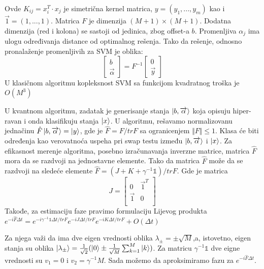 \documentclass[12pt, letterpaper, oneside]{article}
\begin{document}
Ovde $K_{ij} = x_i^T \cdot x_j$ je simetrična kernel matrica, $y = (y_1,...,y_m)$ kao i
$\overrightarrow{1} = (1,...,1)$. Matrica $F$ je dimenzija $(M+1)\times(M+1)$. Dodatna dimenzija (red i kolona) se sastoji od jedinica,
zbog offset-a $b$. Promenljiva $\alpha_j$ ima ulogu određivanja distance od optimalnog rešenja. Tako da rešenje, odnosno pronalaženje promenljivih za SVM je oblika:
\[
    \begin{bmatrix}
        b \\
        \overrightarrow{\alpha}
    \end{bmatrix} =
    F^{-1} \begin{bmatrix}
        0 \\
        \overrightarrow{y}
    \end{bmatrix}
\]
U klasičnom algoritmu kopleksnost SVM sa funkcijom kvadratnog troška je $O(M^3)$ 

U kvantnom algoritmu, zadatak je generisanje stanja $\Ket{b,\overrightarrow{\alpha}}$ koja opisuju hiper-ravan i onda klasifikuju stanja
$\Ket{x}$. U algoritmu, rešavamo normalizovanu jednačinu $\hat{F}\Ket{b,\overrightarrow{\alpha}} = \Ket{y}$, gde je $\hat{F} = F/trF$ sa 
ogranicenjem $\Vert F \Vert \leq 1$. Klasa će biti određenja kao verovatnoća uspeha pri swap testu između $\Ket{b,\overrightarrow{\alpha}}$ i
$\Ket{x}$. Za efikasnost merenje algoritma, posebno izračunavanja inverzne matrice, matrica $\hat{F}$ mora da se razdvoji na jednostavne elemente.
Tako da matrica $\hat{F}$ može da se razdvoji na sledeće elemente $\hat{F} = (J+K+\gamma^{-1}\mathbb{1})/trF$. 
Gde je matrica
\[
    J = \begin{bmatrix}
        0 & \overrightarrow{1}^T \\
        \overrightarrow{1} & 0 \\
    \end{bmatrix}
\]
Takođe, za estimaciju faze pravimo formulaciju Lijevog produkta \\
$e^{-i\hat{F}\varDelta{t}} = e^{-i\gamma^{-1}\mathbb{1}\varDelta{t}/trF}e^{-iJ\varDelta{t}/trF}e^{-iK\varDelta{t}/trF} + O(\varDelta{t})$

Za njega važi da ima dve eigen vrednosti oblika $\lambda_{\pm} = \pm \sqrt{M}$,a, istovetno, 
eigen stanja su oblika $\Ket{\lambda_{\pm}} = \frac{1}{\sqrt{2}}(\Ket{0} \pm \frac{1}{\sqrt{M}}\sum_{k=1}^M\Ket{k})$.
Za matricu $\gamma^{-1}\mathbb{1}$ dve eigne vrednosti su $v_1 = 0$ i $v_2 = \gamma^{-1}M$.
Sada možemo da aproksimiramo fazu za $e^{-i\hat{F}\varDelta{t}}$.
\end{document}

